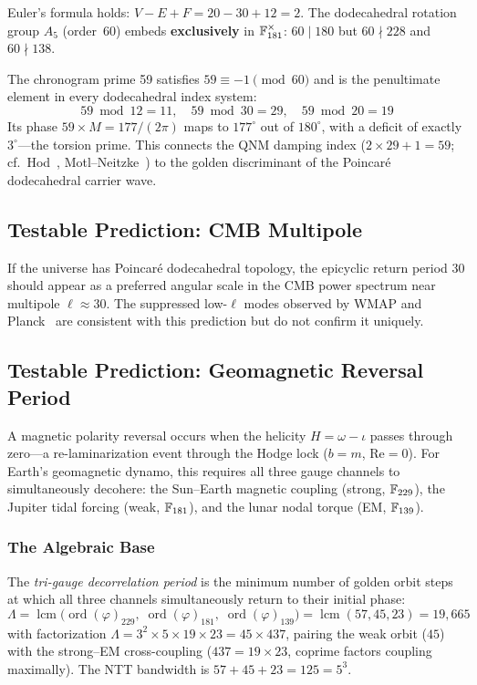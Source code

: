 Euler's formula holds: $V - E + F = 20 - 30 + 12 = 2$. The dodecahedral rotation group $A_5$ (order~60) embeds \textbf{exclusively} in $\mathbb{F}_{181}^{\times}$: $60 \mid 180$ but $60 \nmid 228$ and $60 \nmid 138$.

The chronogram prime 59 satisfies $59 \equiv -1 \pmod{60}$ and is the penultimate element in every dodecahedral index system:
\begin{equation}
    59 \bmod 12 = 11, \quad 59 \bmod 30 = 29, \quad 59 \bmod 20 = 19
\end{equation}
Its phase $59 \times M = 177/(2\pi)$ maps to $177^{\circ}$ out of $180^{\circ}$, with a deficit of exactly $3^{\circ}$---the torsion prime. This connects the QNM damping index ($2 \times 29 + 1 = 59$; cf.\ Hod~\cite{hod1998}, Motl--Neitzke~\cite{motl2003}) to the golden discriminant of the Poincar\'{e} dodecahedral carrier wave.

\subsection{Testable Prediction: CMB Multipole}

If the universe has Poincar\'{e} dodecahedral topology, the epicyclic return period $30$ should appear as a preferred angular scale in the CMB power spectrum near multipole $\ell \approx 30$. The suppressed low-$\ell$ modes observed by WMAP and Planck~\cite{planck2020} are consistent with this prediction but do not confirm it uniquely.

\subsection{Testable Prediction: Geomagnetic Reversal Period}\label{sec:geomag}

A magnetic polarity reversal occurs when the helicity $H = \omega - \iota$ passes through zero---a re-laminarization event through the Hodge lock ($b = m$, $\mathrm{Re} = 0$). For Earth's geomagnetic dynamo, this requires all three gauge channels to simultaneously decohere: the Sun--Earth magnetic coupling (strong, $\mathbb{F}_{229}$), the Jupiter tidal forcing (weak, $\mathbb{F}_{181}$), and the lunar nodal torque (EM, $\mathbb{F}_{139}$).

\subsubsection{The Algebraic Base}

The \emph{tri-gauge decorrelation period} is the minimum number of golden orbit steps at which all three channels simultaneously return to their initial phase:
\begin{equation}\label{eq:trigauge_lcm}
    \Lambda = \operatorname{lcm}\bigl(\operatorname{ord}(\varphi)_{229},\; \operatorname{ord}(\varphi)_{181},\; \operatorname{ord}(\varphi)_{139}\bigr) = \operatorname{lcm}(57, 45, 23) = 19{,}665
\end{equation}
with factorization $\Lambda = 3^2 \times 5 \times 19 \times 23 = 45 \times 437$, pairing the weak orbit ($45$) with the strong--EM cross-coupling ($437 = 19 \times 23$, coprime factors coupling maximally). The NTT bandwidth is $57 + 45 + 23 = 125 = 5^3$.

